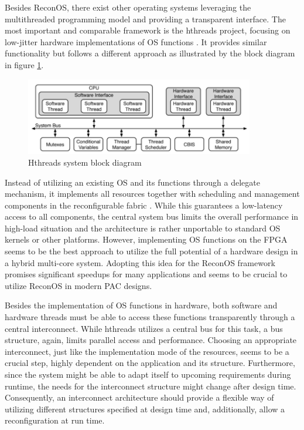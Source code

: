 Besides ReconOS, there exist other operating systems leveraging the
multithreaded programming model and providing a transparent interface. The
most important and comparable framework is the hthreads project, focusing on
low-jitter hardware implementations of \ac{OS} functions \citep{AHK14}. It
provides similar functionality but follows a different approach as illustrated
by the block diagram in figure \ref{fig:hthreads}.
\begin{figure}[tb]
	\centering
	\includegraphics[width=10cm]{../figures/hthreads}
	\caption{Hthreads system block diagram \citep{ASA08}}
	\label{fig:hthreads}
\end{figure}
Instead of utilizing an existing \ac{OS} and its functions through a delegate
mechanism, it implements all resources together with scheduling and management
components in the reconfigurable fabric \citep{ASA08}. While this guarantees a
low-latency access to all components, the central system bus limits the
overall performance in high-load situation and the architecture is rather
unportable to standard \ac{OS} kernels or other platforms. However,
implementing  \ac{OS} functions on the \ac{FPGA} seems to be the best approach
to utilize the full potential of a hardware design in a hybrid multi-core
system. Adopting this idea for the ReconOS framework promises significant
speedups for many applications and seems to be crucial to utilize ReconOS in
modern \ac{PAC} designs.

Besides the implementation of \ac{OS} functions in hardware, both software and
hardware threads must be able to access these functions transparently through
a central interconnect. While hthreads utilizes a central bus for this task, a
bus structure, again, limits parallel access and performance. Choosing an
appropriate interconnect, just like the implementation mode of the resources,
seems to be a crucial step, highly dependent on the application and its
structure. Furthermore, since the system might be able to adapt itself to
upcoming requirements during runtime, the needs for the interconnect
structure might change after design time. Consequently, an interconnect
architecture should provide a flexible way of utilizing different structures
specified at design time and, additionally, allow a reconfiguration at run
time.

